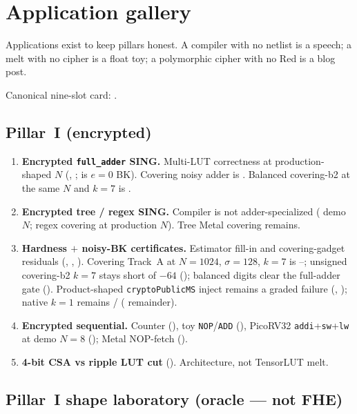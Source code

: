 \chapter{Application gallery}
\label{ch:apps}

Applications exist to keep pillars honest.
A compiler with no netlist is a speech; a melt with no cipher is a float
toy; a polymorphic cipher with no Red is a blog post.

Canonical nine-slot card: .

\section{Pillar~I (encrypted)}

\begin{enumerate}
  \item \textbf{Encrypted \texttt{full\_adder} SING.}
        Multi-LUT correctness at production-shaped $N$ (, ;
         is $e{=}0$ BK). Covering noisy adder is .
        Balanced covering-b2 at the same $N$ and $k{=}7$ is .
  \item \textbf{Encrypted tree / regex SING.}
        Compiler is not adder-specialized ( demo $N$; regex covering
         at production $N$). Tree Metal covering remains.
  \item \textbf{Hardness $+$ noisy-BK certificates.}
        Estimator fill-in and covering-gadget residuals (, ,
        ). Covering Track~A at $N{=}1024$, $\sigma{=}128$, $k{=}7$
        is --; unsigned covering-b2 $k{=}7$ stays short of $-64$ ();
        balanced digits clear the full-adder gate ().
        Product-shaped \texttt{cryptoPublicMS} inject
        remains a graded failure (, ); native $k{=}1$ remains
        / ( remainder).
  \item \textbf{Encrypted sequential.}
        Counter (), toy \texttt{NOP}/\texttt{ADD} (),
        PicoRV32 \texttt{addi}+\texttt{sw}+\texttt{lw} at demo $N{=}8$
        (); Metal NOP-fetch ().
  \item \textbf{4-bit CSA vs ripple LUT cut} ().
        Architecture, not TensorLUT melt.
\end{enumerate}

\section{Pillar~I shape laboratory (oracle --- not FHE)}

